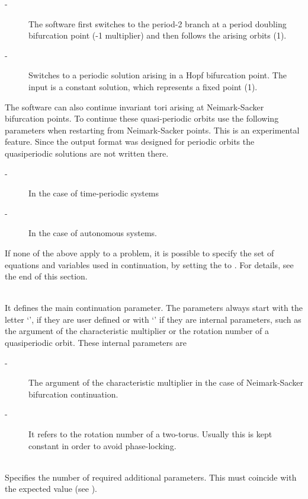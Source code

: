 \documentclass[10pt,a4paper]{ddedoc}
\begin{document}
\begin{description}
\begin{description}
%
\item[ -] The software first switches to the period-2 branch at a period doubling bifurcation point
(-1 multiplier) and then follows the arising orbits (1).
%
\item[ -] Switches to a periodic solution arising in a Hopf bifurcation point. The input is a constant solution, which represents a fixed point (1).
\end{description}
The software can also continue invariant tori arising at Neimark-Sacker bifurcation points. To continue these quasi-periodic orbits use the following parameters when restarting from Neimark-Sacker points. This is an experimental feature. Since the output format was designed for periodic orbits the quasiperiodic solutions are not written there.
\begin{description}
\item[ -] In the case of time-periodic systems
%
\item[ -] In the case of autonomous systems.
\end{description}
If none of the above apply to a problem, it is possible to specify the set of equations and variables used in continuation, by setting the  to . For details, see the end of this section.
%
\item[\funp{CP}] ~\\
It defines the main continuation parameter. The parameters always start with the letter `', if they are user defined or with `' if they are internal parameters, such as the argument of the characteristic multiplier or
the rotation number of a quasiperiodic orbit.
These  internal parameters are
\begin{description}
\item[ -] The argument of the characteristic multiplier in the case of Neimark-Sacker bifurcation continuation.
\item[ -] It refers to the rotation number of a two-torus. Usually this is kept constant in order to avoid phase-locking.
\end{description}
%
\item[\funp{NPARX}] ~\\
Specifies the number of required additional parameters. This must coincide with the expected value (see ).

\end{description}
\end{document}
